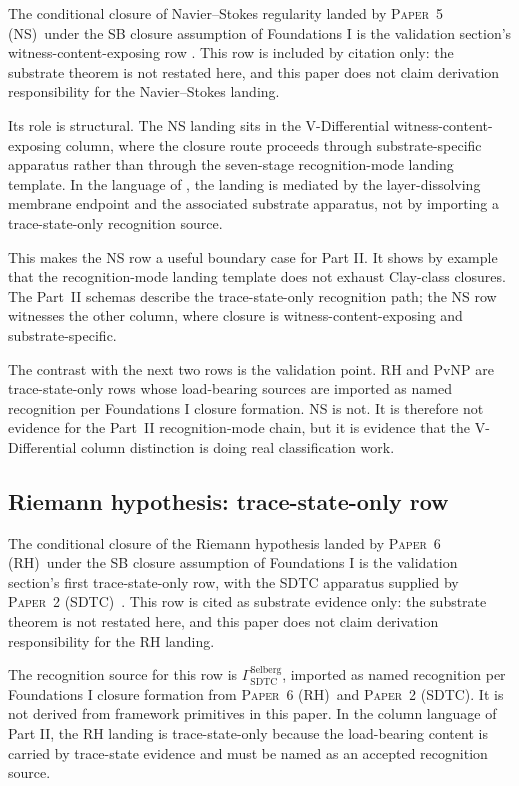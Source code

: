 \documentclass[11pt]{article}
\newcommand{\PaperSDTC}{\textsc{Paper~2 (SDTC)}}
\newcommand{\PaperNS}{\textsc{Paper~5 (NS)}}
\newcommand{\PaperRH}{\textsc{Paper~6 (RH)}}
\newcommand{\VDWCE}{V-Differential witness-content-exposing column}
\newcommand{\SevenStage}{seven-stage recognition-mode landing template}
\theoremstyle{definition}
\begin{document}
The conditional closure of Navier--Stokes regularity landed by \PaperNS\
under the SB closure assumption of Foundations I is the validation
section's witness-content-exposing row
\cite{Tsiokos2026NavierStokes}. This row is included by citation only:
the substrate theorem is not restated here, and this paper does not claim
derivation responsibility for the Navier--Stokes landing.

Its role is structural. The NS landing sits in the \VDWCE, where the
closure route proceeds through substrate-specific apparatus rather than
through the \SevenStage. In the language of \Cref{sec:apparatus}, the
landing is mediated by the layer-dissolving membrane endpoint and the
associated substrate apparatus, not by importing a trace-state-only
recognition source.

This makes the NS row a useful boundary case for Part II. It shows by
example that the recognition-mode landing template does not exhaust
Clay-class closures. The Part~II schemas describe the
trace-state-only recognition path; the NS row witnesses the other
column, where closure is witness-content-exposing and
substrate-specific.

The contrast with the next two rows is the validation point. RH and PvNP
are trace-state-only rows whose load-bearing sources are imported as
named recognition per Foundations I closure formation. NS is not. It is
therefore not evidence for the Part~II recognition-mode chain, but
it is evidence that the V-Differential column distinction is doing
real classification work.

\subsection{Riemann hypothesis: trace-state-only row}\label{sec:validation:rh}

The conditional closure of the Riemann hypothesis landed by \PaperRH\
under the SB closure assumption of Foundations I is the validation
section's first trace-state-only row, with the SDTC apparatus supplied by
\PaperSDTC\ \cite{Tsiokos2026RH,Tsiokos2026SDTC}. This row is cited as
substrate evidence only: the substrate theorem is not restated here, and
this paper does not claim derivation responsibility for the RH landing.

The recognition source for this row is
\(\Gamma_{\text{SDTC}}^{\text{Selberg}}\), imported as named recognition
per Foundations I closure formation from \PaperRH\ and \PaperSDTC. It is
not derived from framework primitives in this paper. In the column
language of Part II, the RH landing is trace-state-only because the
load-bearing content is carried by trace-state evidence and must be named
as an accepted recognition source.
\end{document}
